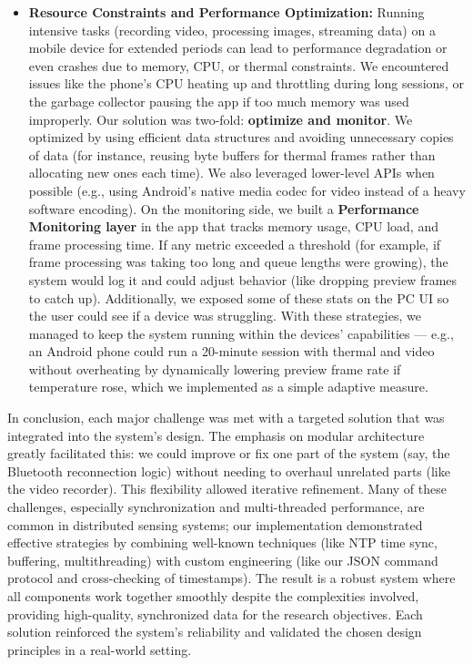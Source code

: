 \documentclass[11pt,a4paper]{report}
\begin{document}
\begin{itemize}
\item \textbf{Resource Constraints and Performance Optimization:} Running
  intensive tasks (recording video, processing images, streaming data)
  on a mobile device for extended periods can lead to performance
  degradation or even crashes due to memory, CPU, or thermal
  constraints. We encountered issues like the phone's CPU heating up and
  throttling during long sessions, or the garbage collector pausing the
  app if too much memory was used improperly. Our solution was two-fold:
  \textbf{optimize and monitor}. We optimized by using efficient data
  structures and avoiding unnecessary copies of data (for instance,
  reusing byte buffers for thermal frames rather than allocating new
  ones each time). We also leveraged lower-level APIs when possible
  (e.g., using Android's native media codec for video instead of a heavy
  software encoding). On the monitoring side, we built a \textbf{Performance
  Monitoring layer} in the app that tracks memory usage, CPU load, and
  frame processing
  time.
  If any metric exceeded a threshold (for example, if frame processing
  was taking too long and queue lengths were growing), the system would
  log it and could adjust behavior (like dropping preview frames to
  catch up). Additionally, we exposed some of these stats on the PC UI
  so the user could see if a device was struggling. With these
  strategies, we managed to keep the system running within the devices'
  capabilities --- e.g., an Android phone could run a 20-minute session
  with thermal and video without overheating by dynamically lowering
  preview frame rate if temperature rose, which we implemented as a
  simple adaptive measure.

\end{itemize}
In conclusion, each major challenge was met with a targeted solution
that was integrated into the system's design. The emphasis on modular
architecture greatly facilitated this: we could improve or fix one part
of the system (say, the Bluetooth reconnection logic) without needing to
overhaul unrelated parts (like the video recorder). This flexibility
allowed iterative refinement. Many of these challenges, especially
synchronization and multi-threaded performance, are common in
distributed sensing systems; our implementation demonstrated effective
strategies by combining well-known techniques (like NTP time sync,
buffering, multithreading) with custom engineering (like our JSON
command protocol and cross-checking of timestamps). The result is a
robust system where all components work together smoothly despite the
complexities involved, providing high-quality, synchronized data for the
research objectives. Each solution reinforced the system's reliability
and validated the chosen design principles in a real-world setting.



\end{document}
